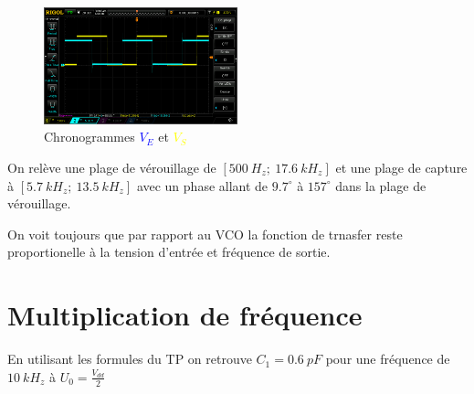 \documentclass[11pt, openright]{book}
\newcommand{\tc}[2]{\textcolor{#1}{#2}}
\begin{document}
\begin{figure}[ht]
    \centering
    \includegraphics[width=0.5\textwidth]{./object/g2.png}
    \caption{Chronogrammes \tc{blue}{$V_E$} et \tc{yellow}{$V_S$}}
\end{figure}

On relève une plage de vérouillage de $[500\ H_z;\ 17.6\ kH_z]$ et une plage de capture à $[5.7\ kH_z;\ 13.5\ kH_z]$ avec un phase allant de $9.7^{\circ}$ à $157^{\circ}$ dans la plage de vérouillage.

\begin{center}
\end{center}

On voit toujours que par rapport au VCO la fonction de trnasfer reste proportionelle à la tension d'entrée et fréquence de sortie.

\newpage

\section{Multiplication de fréquence}

En utilisant les formules du TP on retrouve $C_1=0.6\ pF$ pour une fréquence de $10\ kH_z$ à $U_0=\frac{V_{dd}}{2}$
\end{document}
